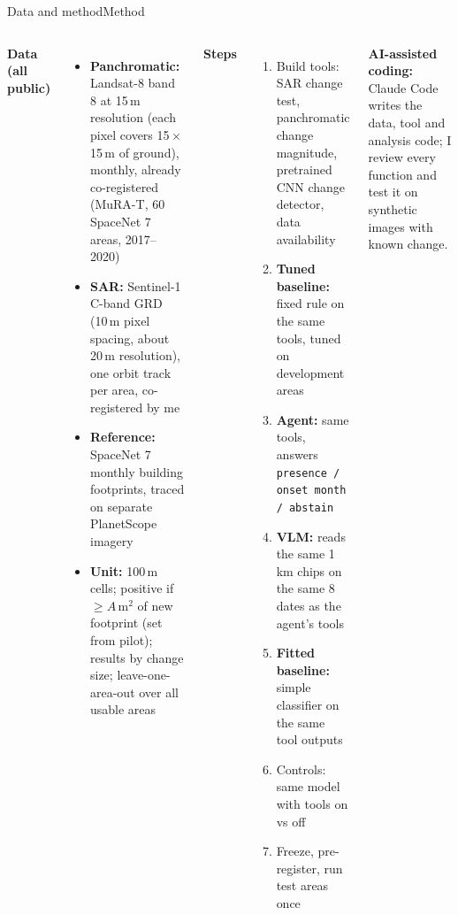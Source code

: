 \documentclass[aspectratio=169,11pt]{beamer}
\begin{document}
\begin{frame}[shrink=26]{Data and method}{Method}
\begin{columns}[T,onlytextwidth]
\textbf{\small Data (all public)}
\begin{itemize}\footnotesize
  \item \textbf{Panchromatic:} Landsat-8 band 8 at 15\,m resolution (each pixel covers 15\,$\times$\,15\,m of ground), monthly, already co-registered (MuRA-T, 60 SpaceNet 7 areas, 2017--2020)
  \item \textbf{SAR:} Sentinel-1 C-band GRD (10\,m pixel spacing, about 20\,m resolution), one orbit track per area, co-registered by me
  \item \textbf{Reference:} SpaceNet 7 monthly building footprints, traced on separate PlanetScope imagery
  \item \textbf{Unit:} 100\,m cells; positive if $\geq A$\,m$^2$ of new footprint (set from pilot); results by change size; leave-one-area-out over all usable areas
\end{itemize}
\textbf{\small Steps}
\begin{enumerate}\footnotesize
  \item Build tools: SAR change test, panchromatic change magnitude, pretrained CNN change detector, data availability
  \item \textbf{Tuned baseline:} fixed rule on the same tools, tuned on development areas
  \item \textbf{Agent:} same tools, answers \texttt{presence / onset month / abstain}
  \item \textbf{VLM:} reads the same 1\,km chips on the same 8 dates as the agent's tools
  \item \textbf{Fitted baseline:} simple classifier on the same tool outputs
  \item Controls: same model with tools on vs off
  \item Freeze, pre-register, run test areas once
\end{enumerate}
{\footnotesize\textbf{AI-assisted coding:} Claude Code writes the data, tool and analysis code; I review every function and test it on synthetic images with known change.}
\end{columns}
\end{frame}
\end{document}
